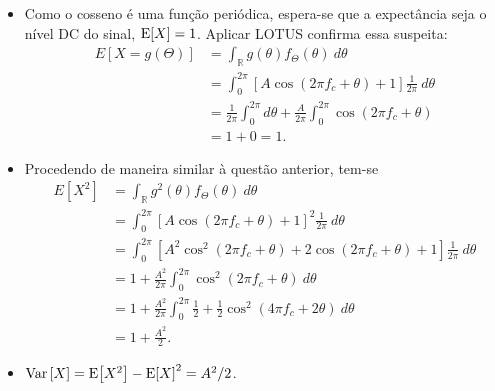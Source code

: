 \begin{itemize}
    \item [a)] 
    Como o cosseno é uma função periódica, espera-se que a expectância seja o nível DC do sinal, $\mathrm{E}\!\left[X\right]=1$. Aplicar LOTUS confirma essa suspeita:
    \begin{align}
        E[X=g(\Theta)] 
        &= \int_\mathbb{R} g(\theta) f_\Theta(\theta) \ d\theta \\
        &= \int_0^{2\pi} [A \cos(2\pi f_c + \theta) + 1] \frac{1}{2\pi} \ d\theta \\
        &= \frac{1}{2\pi} \int_0^{2\pi} d\theta + 
           \frac{A}{2\pi} \int_0^{2\pi} \cos(2\pi f_c + \theta) \\
        &= 1 + 0 = 1.
    \end{align}
    
    \item [b)] 
    Procedendo de maneira similar à questão anterior, tem-se
    \begin{align}
        E[X^2] 
        &= \int_\mathbb{R} g^2(\theta) f_\Theta(\theta) \ d\theta \\
        &= \int_0^{2\pi} [A \cos(2\pi f_c + \theta) + 1]^2 \frac{1}{2\pi} \ d\theta \\
        &= \int_0^{2\pi} [A^2 \cos^2(2\pi f_c + \theta) + 2\cos(2\pi f_c + \theta) + 1] \frac{1}{2\pi} \ d\theta \\
        &= 1 + \frac{A^2}{2\pi} \int_0^{2\pi} \cos^2(2\pi f_c + \theta) \ d\theta \\
        &= 1 + \frac{A^2}{2\pi} \int_0^{2\pi} \frac{1}{2} + \frac{1}{2}\cos^2(4\pi f_c + 2\theta) \ d\theta \\
        &= 1 + \frac{A^2}{2}.
    \end{align}
    
    \item [c)] 
    $\mathrm{Var}\left[X\right] = \mathrm{E}\!\left[X^2\right] - \mathrm{E}\!\left[X\right]^2 = A^2/2$.
\end{itemize}